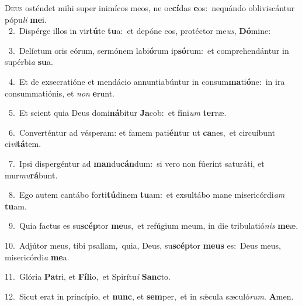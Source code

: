 \lettrine{\initial\textcolor{\initialcolor}{D}}{eus} osténdet mihi super inimícos meos, ne oc\-\textbf{cí}\-das \textbf{e}\-os:~\star nequándo obliviscántur pópu\textit{li} \textbf{me}\-i.\\
{\numbfont\textcolor{\numbcolor}{~2.}}~Dispérge illos in vir\-\textbf{tú}\-te \textbf{tu}\-a:~\star et depóne eos, protéctor me\-\textit{us}\-, \textbf{Dó}\-mine:\par
{\numbfont\textcolor{\numbcolor}{~3.}}~Delíctum oris eórum, sermónem labi\-\textbf{ó}\-rum ip\-\textbf{só}\-rum:~\star et comprehendántur in supérbi\textit{a} \textbf{su}\-a.\par
{\numbfont\textcolor{\numbcolor}{~4.}}~Et de exsecratióne et mendácio annuntiabúntur in consum\-\textbf{ma}\-ti\-\textbf{ó}\-ne:~\star in ira consummatiónis, et \textit{non} \textbf{e}\-runt.\par
{\numbfont\textcolor{\numbcolor}{~5.}}~Et scient quia Deus domi\-\textbf{ná}\-bitur \textbf{Ja}\-cob:~\star et fíni\textit{um} \textbf{ter}\-ræ.\par
{\numbfont\textcolor{\numbcolor}{~6.}}~Converténtur ad vésperam: et famem pati\-\textbf{én}\-tur ut \textbf{ca}\-nes,~\star et circuíbunt ci\-\textit{vi}\-\textbf{tá}tem.\par
{\numbfont\textcolor{\numbcolor}{~7.}}~Ipsi dispergéntur ad \textbf{man}\-du\-\textbf{cán}\-dum:~\star si vero non fúerint saturáti, et mur\-\textit{mu}\-\textbf{rá}bunt.\par
{\numbfont\textcolor{\numbcolor}{~8.}}~Ego autem cantábo forti\-\textbf{tú}\-dinem \textbf{tu}\-am:~\star et exsultábo mane misericórdi\textit{am} \textbf{tu}\-am.\par
{\numbfont\textcolor{\numbcolor}{~9.}}~Quia factus es su\-\textbf{scép}\-tor \textbf{me}\-us,~\star et refúgium meum, in die tribulatió\textit{nis} \textbf{me}\-æ.\par
{\numbfont\textcolor{\numbcolor}{10.}}~Adjútor meus, tibi psallam,~\dagger quia, Deus, su\-\textbf{scép}\-tor \textbf{me}\-\textbf{us} es:~\star Deus meus, misericórdi\textit{a} \textbf{me}\-a.\par
{\numbfont\textcolor{\numbcolor}{11.}}~Glória \textbf{Pa}\-tri, et \textbf{Fí}\-\textbf{li}o,~\star et Spirítu\textit{i} \textbf{Sanc}\-to.\par
{\numbfont\textcolor{\numbcolor}{12.}}~Sicut erat in princípio, et \textbf{nunc}\-, et \textbf{sem}\-per,~\star et in sǽcula sæculó\-\textit{rum}\-. \textbf{A}\-men.\par
